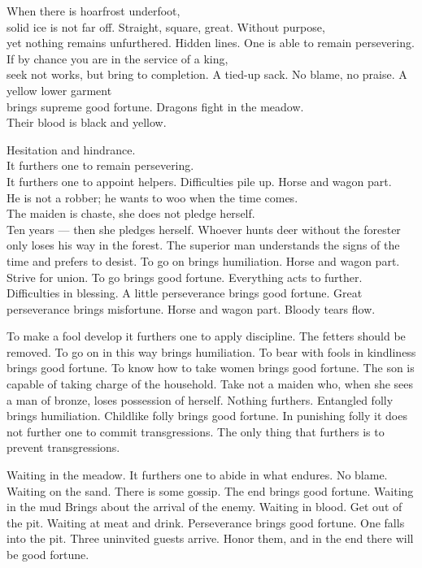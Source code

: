 {When there is hoarfrost underfoot,\\
 solid ice is not far off.}
{Straight, square, great. Without purpose,\\
 yet nothing remains unfurthered.}
{Hidden lines. One is able to remain persevering.\\
 If by chance you are in the service of a king,\\
 seek not works, but bring to completion.}
{A tied-up sack. No blame, no praise.}
{A yellow lower garment\\
 brings supreme good fortune.}
{Dragons fight in the meadow.\\
 Their blood is black and yellow.}

{Hesitation and hindrance.\\
 It furthers one to remain persevering.\\
 It furthers one to appoint helpers.}
{Difficulties pile up. Horse and wagon part.\\
 He is not a robber; he wants to woo when the time comes.\\
 The maiden is chaste, she does not pledge herself.\\
 Ten years --- then she pledges herself.}
{Whoever hunts deer without the forester
 only loses his way in the forest.
 The superior man understands the signs of the time
 and prefers to desist.
 To go on brings humiliation.}
{Horse and wagon part.
 Strive for union.
 To go brings good fortune.
 Everything acts to further.}
{Difficulties in blessing.
 A little perseverance brings good fortune.
 Great perseverance brings misfortune.}
{Horse and wagon part.
 Bloody tears flow.}

{To make a fool develop it furthers one to apply discipline.
 The fetters should be removed.
 To go on in this way brings humiliation.}
{To bear with fools in kindliness brings good fortune.
 To know how to take women brings good fortune.
 The son is capable of taking charge of the household.}
{Take not a maiden who, when she sees a man of bronze,
 loses possession of herself. Nothing furthers.}
{Entangled folly brings humiliation.}
{Childlike folly brings good fortune.}
{In punishing folly it does not further one to commit transgressions.
 The only thing that furthers is to prevent transgressions.}

{Waiting in the meadow.
 It furthers one to abide in what endures.
 No blame.}
{Waiting on the sand.
 There is some gossip.
 The end brings good fortune.}
{Waiting in the mud
 Brings about the arrival of the enemy.}
{Waiting in blood.
 Get out of the pit.}
{Waiting at meat and drink.
 Perseverance brings good fortune.}
{One falls into the pit.
 Three uninvited guests arrive.
 Honor them, and in the end there will be good fortune.}

